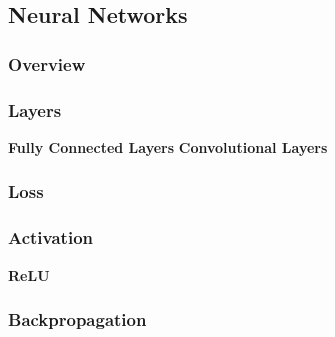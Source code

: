 \documentclass[../Main.tex]{subfiles}
\begin{document}
\subsection{Neural Networks}


    \subsubsection{Overview}
    \subsubsection{Layers}
        \textbf{Fully Connected Layers}
        \textbf{Convolutional Layers}
    \subsubsection{Loss} %
    \subsubsection{Activation}
        \textbf{ReLU}
    \subsubsection{Backpropagation}
\end{document}
